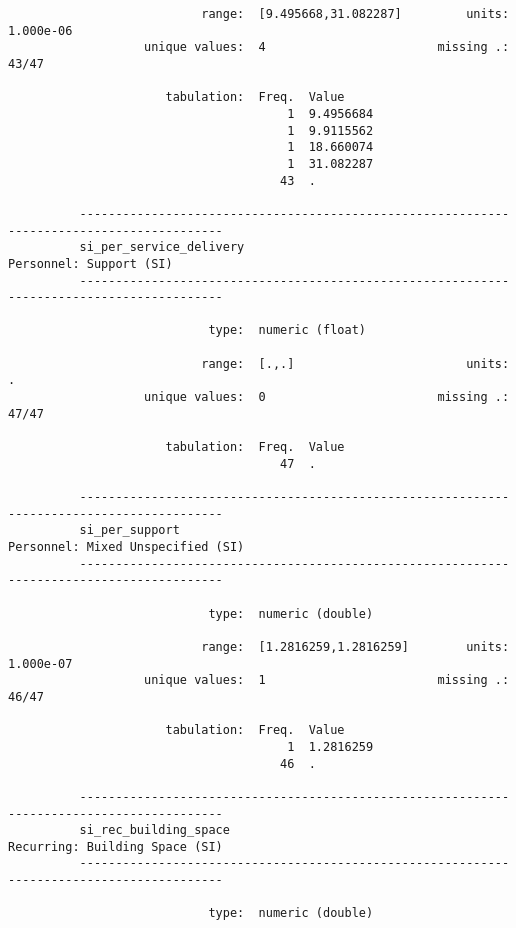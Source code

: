 \documentclass{article}
\begin{document}
\begin{verbatim}
                           range:  [9.495668,31.082287]         units:  1.000e-06
                   unique values:  4                        missing .:  43/47
          
                      tabulation:  Freq.  Value
                                       1  9.4956684
                                       1  9.9115562
                                       1  18.660074
                                       1  31.082287
                                      43  .
          
          ------------------------------------------------------------------------------------------
          si_per_service_delivery                                            Personnel: Support (SI)
          ------------------------------------------------------------------------------------------
          
                            type:  numeric (float)
          
                           range:  [.,.]                        units:  .
                   unique values:  0                        missing .:  47/47
          
                      tabulation:  Freq.  Value
                                      47  .
          
          ------------------------------------------------------------------------------------------
          si_per_support                                           Personnel: Mixed Unspecified (SI)
          ------------------------------------------------------------------------------------------
          
                            type:  numeric (double)
          
                           range:  [1.2816259,1.2816259]        units:  1.000e-07
                   unique values:  1                        missing .:  46/47
          
                      tabulation:  Freq.  Value
                                       1  1.2816259
                                      46  .
          
          ------------------------------------------------------------------------------------------
          si_rec_building_space                                       Recurring: Building Space (SI)
          ------------------------------------------------------------------------------------------
          
                            type:  numeric (double)
          

\end{verbatim}
\end{document}
